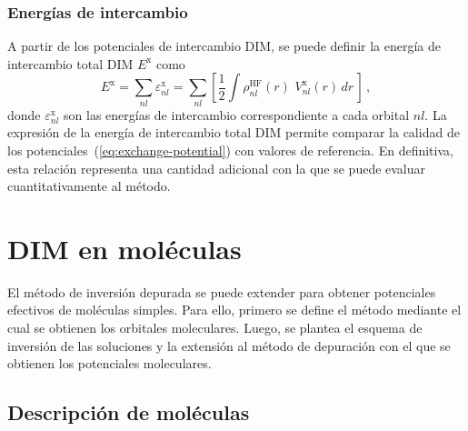 \subsubsection*{Energías de intercambio}

A partir de los potenciales de intercambio DIM, se puede definir la 
energía de intercambio total DIM $E^{\mathrm{x}}$ como
\begin{equation}
E^{\mathrm{x}} = \sum_{nl}\varepsilon_{nl}^{\mathrm{x}} = 
\sum_{nl}\left[\frac{1}{2}\int{\rho^{\mathrm{HF}}_{nl}(r) \, \, 
V_{nl}^{\mathrm{x}}}(r) \, dr \, \right]\,,
\label{eq:exchange-energy}
\end{equation}
donde $\varepsilon_{nl}^{\mathrm{x}}$ son las energías de intercambio 
correspondiente a cada orbital $nl$. La expresión de la energía de 
intercambio total DIM permite comparar la calidad de los 
potenciales~(\ref{eq:exchange-potential}) con valores de referencia. 
En definitiva, esta relación representa una cantidad adicional con la 
que se puede evaluar cuantitativamente al método.

\section{DIM en moléculas}
\label{sec:dimmoleculas}

El método de inversión depurada se puede extender para obtener 
potenciales efectivos de moléculas simples. Para ello, primero se 
define el método mediante el cual se obtienen los orbitales moleculares.
Luego, se plantea el esquema de inversión de las soluciones y la 
extensión al método de depuración con el que se obtienen los potenciales 
moleculares. 

\subsection{Descripción de moléculas}
\label{sec:moleculas}


